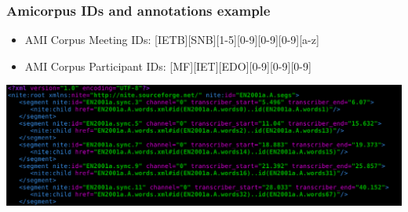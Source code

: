 \begin{frame}
    \frametitle{Amicorpus IDs and annotations example}
    \begin{itemize}
    \item AMI Corpus Meeting IDs: [IETB][SNB][1-5][0-9][0-9][0-9][a-z]
    \item AMI Corpus Participant IDs: [MF][IET][EDO][0-9][0-9][0-9]
    \end{itemize}
    \begin{center}
      \includegraphics[height=0.4\textheight]{graphics/segments_annotations}
    \end{center}  
    
\end{frame}

